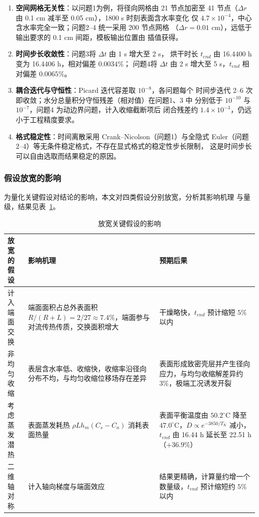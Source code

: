 \documentclass[12pt,a4paper]{article}
\begin{document}
\begin{center}
\begin{enumerate}
\item \textbf{空间网格无关性}：以问题1为例，将径向网格由 21 节点加密至
41 节点（$\Delta r$ 由 0.1 cm 减半至 0.05 cm），1800 s 时刻表面含水率变化
仅 $4.7\times10^{-4}$，中心含水率完全一致；问题2--4 统一采用 200 节点网格
（$\Delta r=0.01$ cm），远低于输出要求的 0.1 cm 间距，模板输出位置由
插值获得。
\item \textbf{时间步长收敛性}：问题3将 $\Delta t$ 由 1 s 增大至 2 s，
烘干时长 $t_{end}$ 由 16.4400 h 变为 16.4406 h，相对偏差 $0.0034\%$；
问题4将 $\Delta t$ 由 2 s 增大至 5 s，$t_{end}$ 相对偏差 $0.0065\%$。
\item \textbf{耦合迭代与守恒性}：Picard 迭代容差取 $10^{-8}$，各问题每个
时间步迭代 2--6 次即收敛；水分总量积分守恒残差（相对值）在问题1、3 中
分别低于 $10^{-10}$ 与 $10^{-7}$，问题4 为动边界问题，计入收缩截断项后
闭合残差约 $1.4\times10^{-3}$，仍远小于工程精度要求。
\item \textbf{格式稳定性}：时间离散采用 Crank--Nicolson（问题1）与全隐式
Euler（问题2--4）等无条件稳定格式，不存在显式格式的稳定性步长限制，
这是时间步长可以自由选取而结果稳定的原因。
\end{enumerate}

\subsubsection{假设放宽的影响}
为量化关键假设对结论的影响，本文对四类假设分别放宽，分析其影响机理
与量级，结果见表~\ref{tab:assumption-relax}。

\begin{table}[H]
\centering
\caption{放宽关键假设的影响}
\label{tab:assumption-relax}
\begin{tabular}{p{3.6cm}p{6.2cm}p{4.4cm}}
\toprule
放宽的假设 & 影响机理 & 预期后果\\
\midrule
计入端面交换 & 端面面积占总外表面积 $R/(R+L)=2/27\approx7.4\%$，端面参与对流传热传质，交换面积增大 & 干燥略快，$t_{end}$ 预计缩短 $5\%$ 以内\\
非均匀收缩 & 表层含水率低、收缩快，收缩率沿径向分布不均，与均匀收缩位移场存在差异 & 表面形成致密壳层并产生径向应力，与均匀收缩解差异约 $3\%$，极端工况诱发开裂\\
考虑蒸发潜热 & 表面蒸发耗热 $\rho L h_m(C_s-C_a)$ 消耗表面热量 & 表面平衡温度由 $50.2^\circ$C 降至 $47.0^\circ$C，$D\propto e^{-3850/T_K}$ 减小，$t_{end}$ 由 16.44 h 延长至 22.51 h（$+36.9\%$）\\
二维轴对称 & 计入轴向梯度与端面效应 & 结果更精确，计算量约增一个数量级，$t_{end}$ 预计缩短约 $5\%$ 以内\\
\bottomrule
\end{tabular}
\end{table}


\end{center}
\end{document}
